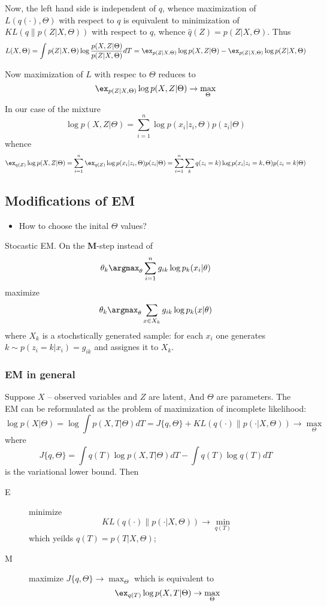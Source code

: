 \documentclass[a4paper]{article}
\begin{document}
Now, the left hand side is independent of $q$, whence maximization of $L(q(\cdot),\Theta)$
with respect to $q$ is equivalent to minimization of $KL(q\|p(Z|X,\Theta))$ with respect
to $q$, whence $\hat{q}(Z) = p(Z|X,\Theta)$. Thus
\[
L(X,\Theta)
= \int p(Z|X,\Theta) \log \frac{p(X,Z|\Theta)}{p(Z|X,\Theta)} dT
= \ex_{p(Z|X,\Theta)} \log p(X,Z|\Theta) - \ex_{p(Z|X,\Theta)} \log p(Z|X,\Theta)
\]

Now maximization of $L$ with respec to $\Theta$ reduces to
\[ \ex_{p(Z|X,\Theta)} \log p(X,Z|\Theta) \to \max_\Theta \]
In our case of the mixture
\[
\log p(X,Z|\Theta)
= \sum_{i=1}^n \log p(x_i|z_i,\Theta) p(z_i|\Theta)
\]
whence
\[
\ex_{q(Z)} \log p(X,Z|\Theta)
= \sum_{i=1}^n \ex_{q(Z)} \log p(x_i|z_i,\Theta) p(z_i|\Theta)
= \sum_{i=1}^n \sum_k q(z_i=k) \log p(x_i|z_i=k,\Theta) p(z_i=k|\Theta)
\]


\subsection{Modifications of EM} %
\label{sub:modifications_of_em}

\begin{itemize}
	\item How to choose the inital $\Theta$ values? 
\end{itemize}

Stocastic EM. On the \textbf{M}-step instead of 
\[ \theta_k \argmax_\theta \sum_{i=1}^n g_{ik} \log p_k(x_i|\theta) \]
maximize
\[ \theta_k \argmax_\theta \sum_{x\in X_k} g_{ik} \log p_k(x|\theta) \]
where $X_k$ is a stochstically generated sample: for each $x_i$ one
generates $k\sim p(z_i=k|x_i) = g_{ik}$ and assignes it to $X_k$.


\subsubsection{EM in general} %
\label{ssub:em_in_general}

Suppose $X$ -- observed variables and $Z$ are latent, And $\Theta$ are parameters.
The EM can be reformulated as the problem of maximization of incomplete likelihood:
\[
\log p(X|\Theta)
= \log \int p(X,T|\Theta) dT
= J\{q,\Theta\} + KL(q(\cdot)\|p(\cdot|X,\Theta)) \to \max_\Theta
\]
where 
\[J\{q,\Theta\} = \int q(T) \log p(X,T|\Theta) dT - \int q(T) \log q(T) dT \]
is the variational lower bound. Then \begin{description}
	\item[E] minimize 
	\[KL(q(\cdot)\|p(\cdot|X,\Theta)) \to \min_{q(T)}\] which yeilds $q(T) = p(T|X,\Theta)$;
	\item[M] maximize $J\{q,\Theta\} \to \max_\Theta$ which is equivalent to
		\[\ex_{q(T)} \log p(X,T|\Theta) \to \max_\Theta\]
\end{description} 
\end{document}
